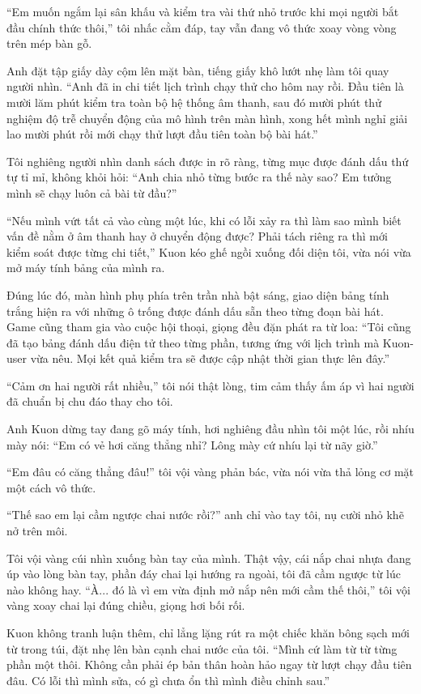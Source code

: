 ﻿\documentclass[../main.tex]{subfiles}
\begin{document}
``Em muốn ngắm lại sân khấu và kiểm tra vài thứ nhỏ trước khi mọi người bắt đầu chính thức thôi,'' tôi nhấc cằm đáp, tay vẫn đang vô thức xoay vòng vòng trên mép bàn gỗ.

Anh đặt tập giấy dày cộm lên mặt bàn, tiếng giấy khô lướt nhẹ làm tôi quay người nhìn. ``Anh đã in chi tiết lịch trình chạy thử cho hôm nay rồi. Đầu tiên là mười lăm phút kiểm tra toàn bộ hệ thống âm thanh, sau đó mười phút thử nghiệm độ trễ chuyển động của mô hình trên màn hình, xong hết mình nghỉ giải lao mười phút rồi mới chạy thử lượt đầu tiên toàn bộ bài hát.''

Tôi nghiêng người nhìn danh sách được in rõ ràng, từng mục được đánh dấu thứ tự tỉ mỉ, không khỏi hỏi: ``Anh chia nhỏ từng bước ra thế này sao? Em tưởng mình sẽ chạy luôn cả bài từ đầu?''

``Nếu mình vứt tất cả vào cùng một lúc, khi có lỗi xảy ra thì làm sao mình biết vấn đề nằm ở âm thanh hay ở chuyển động được? Phải tách riêng ra thì mới kiểm soát được từng chi tiết,'' Kuon kéo ghế ngồi xuống đối diện tôi, vừa nói vừa mở máy tính bảng của mình ra.

Đúng lúc đó, màn hình phụ phía trên trần nhà bật sáng, giao diện bảng tính trắng hiện ra với những ô trống được đánh dấu sẵn theo từng đoạn bài hát. Game cũng tham gia vào cuộc hội thoại, giọng đều đặn phát ra từ loa: ``Tôi cũng đã tạo bảng đánh dấu điện tử theo từng phần, tương ứng với lịch trình mà Kuon-user vừa nêu. Mọi kết quả kiểm tra sẽ được cập nhật thời gian thực lên đây.''

``Cảm ơn hai người rất nhiều,'' tôi nói thật lòng, tim cảm thấy ấm áp vì hai người đã chuẩn bị chu đáo thay cho tôi.

Anh Kuon dừng tay đang gõ máy tính, hơi nghiêng đầu nhìn tôi một lúc, rồi nhíu mày nói: ``Em có vẻ hơi căng thẳng nhỉ? Lông mày cứ nhíu lại từ nãy giờ.''

``Em đâu có căng thẳng đâu!'' tôi vội vàng phản bác, vừa nói vừa thả lỏng cơ mặt một cách vô thức.

``Thế sao em lại cầm ngược chai nước rồi?'' anh chỉ vào tay tôi, nụ cười nhỏ khẽ nở trên môi.

Tôi vội vàng cúi nhìn xuống bàn tay của mình. Thật vậy, cái nắp chai nhựa đang úp vào lòng bàn tay, phần đáy chai lại hướng ra ngoài, tôi đã cầm ngược từ lúc nào không hay. ``À... đó là vì em vừa định mở nắp nên mới cầm thế thôi,'' tôi vội vàng xoay chai lại đúng chiều, giọng hơi bối rối.

Kuon không tranh luận thêm, chỉ lẳng lặng rút ra một chiếc khăn bông sạch mới từ trong túi, đặt nhẹ lên bàn cạnh chai nước của tôi. ``Mình cứ làm từ từ từng phần một thôi. Không cần phải ép bản thân hoàn hảo ngay từ lượt chạy đầu tiên đâu. Có lỗi thì mình sửa, có gì chưa ổn thì mình điều chỉnh sau.''
\end{document}
